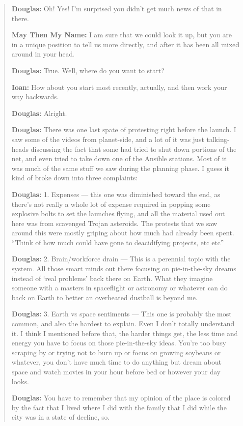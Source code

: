 \begin{quote}
\textbf{Douglas:} Oh! Yes! I'm surprised you didn't get much news of that in there.

\textbf{May Then My Name:} I am sure that we could look it up, but you are in a unique position to tell us more directly, and after it has been all mixed around in your head.

\textbf{Douglas:} True. Well, where do you want to start?

\textbf{Ioan:} How about you start most recently, actually, and then work your way backwards.

\textbf{Douglas:} Alright.

\textbf{Douglas:} There was one last spate of protesting right before the launch. I saw some of the videos from planet-side, and a lot of it was just talking-heads discussing the fact that some had tried to shut down portions of the net, and even tried to take down one of the Ansible stations. Most of it was much of the same stuff we saw during the planning phase. I guess it kind of broke down into three complaints:

\textbf{Douglas:} 1. Expenses — this one was diminished toward the end, as there's not really a whole lot of expense required in popping some explosive bolts to set the launches flying, and all the material used out here was from scavenged Trojan asteroids. The protests that we saw around this were mostly griping about how much had already been spent. ``Think of how much could have gone to deacidifying projects, etc etc''

\textbf{Douglas:} 2. Brain/workforce drain — This is a perennial topic with the system. All those smart minds out there focusing on pie-in-the-sky dreams instead of `real problems' back there on Earth. What they imagine someone with a masters in spaceflight or astronomy or whatever can do back on Earth to better an overheated dustball is beyond me.

\textbf{Douglas:} 3. Earth vs space sentiments — This one is probably the most common, and also the hardest to explain. Even I don't totally understand it. I think I mentioned before that, the harder things get, the less time and energy you have to focus on those pie-in-the-sky ideas. You're too busy scraping by or trying not to burn up or focus on growing soybeans or whatever, you don't have much time to do anything but dream about space and watch movies in your hour before bed or however your day looks.

\textbf{Douglas:} You have to remember that my opinion of the place is colored by the fact that I lived where I did with the family that I did while the city was in a state of decline, so.


\end{quote}
